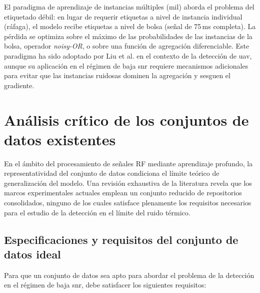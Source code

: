 El paradigma de aprendizaje de instancias múltiples (\gls{mil}) aborda el problema
del etiquetado débil: en lugar de requerir etiquetas a nivel de instancia
individual (ráfaga), el modelo recibe etiquetas a nivel de bolsa (señal de 75\,ms
completa). La pérdida se optimiza sobre el máximo de las probabilidades de las
instancias de la bolsa, operador \textit{noisy-OR}, o sobre una función de
agregación diferenciable. Este paradigma ha sido adoptado por Liu et al.
\cite{liu_transformer-based_2025} en el contexto de la detección de \gls{uav}, aunque
su aplicación en el régimen de baja \gls{snr} requiere mecanismos adicionales para
evitar que las instancias ruidosas dominen la agregación y sesguen el gradiente.

\section{Análisis crítico de los conjuntos de datos existentes}
\label{sec:analisis_datasets}

En el ámbito del procesamiento de señales RF mediante aprendizaje profundo, la
representatividad del conjunto de datos condiciona el límite teórico de
generalización del modelo. Una revisión exhaustiva de la literatura revela que los
marcos experimentales actuales emplean un conjunto reducido de repositorios
consolidados, ninguno de los cuales satisface plenamente los requisitos necesarios
para el estudio de la detección en el límite del ruido térmico.

\subsection{Especificaciones y requisitos del conjunto de datos ideal}
\label{subsec:requisitos_dataset}

Para que un conjunto de datos sea apto para abordar el problema de la detección
en el régimen de baja \gls{snr}, debe satisfacer los siguientes requisitos:

